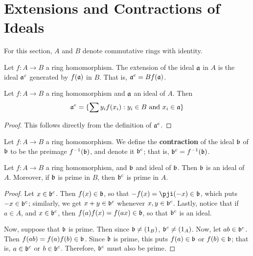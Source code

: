 \section{Extensions and Contractions of Ideals}

For this section, $A$ and  $B$ denote commutative rings with identity.

\begin{definition}
  Let $f:A \xrightarrow{} B$ a ring homomorphism. The extension of the ideal
  $\af$ in $A$ is the ideal $\af^\e$ generated by $f(\af)$ in $B$. That is,
  $\af^e=Bf(\af)$.
\end{definition}

\begin{lemma}\label{1.10.1}
    Let $f:A \xrightarrow{} B$ a ring homomorphism and $\af$ an ideal of $A$.
    Then
    \begin{equation*}
        \af^e=\{\sum{y_if(x_i) : y_i \in B \text{ and } x_i \in \af}\}
    \end{equation*}
\end{lemma}
\begin{proof}
    This follows directly from the definition of $\af^e$.
\end{proof}

\begin{definition}
    Let $f:A \xrightarrow{} B$ a ring homomorphism. We define the
    \textbf{contraction} of the ideal $\bf$ of  $\bf$ to be the preimage
    $\inv{f}(\bf)$, and denote it $\bf^c$; that is,  $\bf^c=\inv{f}(\bf)$.
\end{definition}

\begin{lemma}\label{1.10.2}
    Let $f:A \xrightarrow{} B$ a ring homomorphism, and $\bf$ and ideal of
    $\bf$. Then $\bf$ is an ideal of $A$. Moreover, if $\bf$ is prime in $B$,
    then  $\bf^c$ is prime in $A$.
\end{lemma}
\begin{proof}
    Let $x \in \bf^c$. Then  $f(x) \in \bf$, so that $-f(x)=\pji(-x) \in
    \bf$, which puts $-x \in \bf^c$; similarly, we get $x+y \in \bf^c$ whenever
    $x,y \in \bf^c$. Lastly, notice that if  $a \in A$, and  $x \in \bf^c$, then
     $f(a)f(x)=f(ax) \in \bf$, so that $\bf^c$ is an ideal.

     Now, suppose that  $\bf$ is prime. Then since  $\bf \neq (1_B)$, $\bf^c
     \neq (1_A)$. Now, let $ab \in \bf^c$. Then  $f(ab)=f(a)f(b) \in
     \bf$. Since $\bf$ is prime, this puts  $f(a) \in \bf$ or $f(b) \in
     \bf$; that is, $a \in \bf^c$ or  $b \in \bf^c$. Therefore, $\bf^c$ must
     also be prime.
\end{proof}


